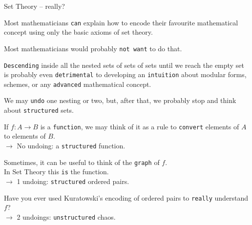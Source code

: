 \documentclass{beamer}
\begin{document}
\begin{frame}[fragile]{Set Theory -- really?}

Most mathematicians {\color{violet}\verb`can`} explain how to encode their favourite mathematical concept using only the basic axioms of set theory.

Most mathematicians would probably {\color{violet}\verb`not want`} to do that.

{\color{violet}\verb`Descending`} inside all the nested sets of sets of sets until we reach the empty set is probably even {\color{violet}\verb`detrimental`} to developing an {\color{violet}\verb`intuition`} about modular forms, schemes, or any {\color{violet}\verb`advanced`} mathematical concept.
\end{frame}

\begin{frame}[fragile]

We may {\color{violet}\verb`undo`} one nesting or two, but, after that, we probably stop and think about {\color{violet}\verb`structured`} sets.

If $f \colon A \longrightarrow B$ is a {\color{violet}\verb`function`}, we may think of it as a rule to {\color{violet}\verb`convert`} elements of $A$ to elements of $B$. \\
$\to$ No undoing: a {\color{violet}\verb`structured`} function.

Sometimes, it can be useful to think of the {\color{violet}\verb`graph`} of $f$. \\
In Set Theory this {\color{violet}\verb`is`} the function. \\
$\to$ 1 undoing: {\color{violet}\verb`structured`} ordered pairs.

Have you ever used Kuratowski's encoding of ordered pairs to {\color{violet}\verb`really`} understand $f$? \\
$\to$ 2 undoings: {\color{violet}\verb`unstructured`} chaos.
\end{frame}
\end{document}
